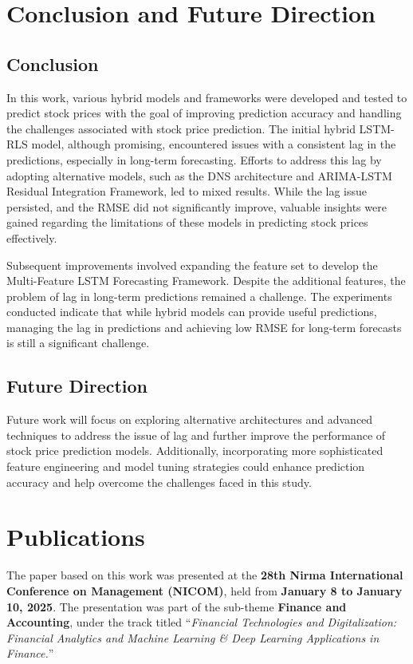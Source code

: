 \chapter{Conclusion and Future Direction}

\section{Conclusion}
In this work, various hybrid models and frameworks were developed and tested to predict stock prices with the goal of improving prediction accuracy and handling the challenges associated with stock price prediction. The initial hybrid LSTM-RLS model, although promising, encountered issues with a consistent lag in the predictions, especially in long-term forecasting. Efforts to address this lag by adopting alternative models, such as the DNS architecture and ARIMA-LSTM Residual Integration Framework, led to mixed results. While the lag issue persisted, and the RMSE did not significantly improve, valuable insights were gained regarding the limitations of these models in predicting stock prices effectively.

Subsequent improvements involved expanding the feature set to develop the Multi-Feature LSTM Forecasting Framework. Despite the additional features, the problem of lag in long-term predictions remained a challenge. The experiments conducted indicate that while hybrid models can provide useful predictions, managing the lag in predictions and achieving low RMSE for long-term forecasts is still a significant challenge.

\section{Future Direction}
Future work will focus on exploring alternative architectures and advanced techniques to address the issue of lag and further improve the performance of stock price prediction models. Additionally, incorporating more sophisticated feature engineering and model tuning strategies could enhance prediction accuracy and help overcome the challenges faced in this study.

\chapter{Publications}
The paper based on this work was presented at the \textbf{28th Nirma International Conference on Management (NICOM)}, held from \textbf{January 8 to January 10, 2025}. The presentation was part of the sub-theme \textbf{Finance and Accounting}, under the track titled “\textit{Financial Technologies and Digitalization: Financial Analytics and Machine Learning \& Deep Learning Applications in Finance.}”